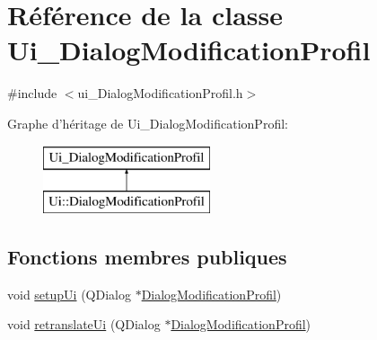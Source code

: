 \hypertarget{class_ui___dialog_modification_profil}{\section{Référence de la classe Ui\-\_\-\-Dialog\-Modification\-Profil}
\label{class_ui___dialog_modification_profil}
}


{\ttfamily \#include $<$ui\-\_\-\-Dialog\-Modification\-Profil.\-h$>$}

Graphe d'héritage de Ui\-\_\-\-Dialog\-Modification\-Profil\-:\begin{figure}[H]
\begin{center}
\leavevmode
\includegraphics[height=2.000000cm]{class_ui___dialog_modification_profil}
\end{center}
\end{figure}
\subsection*{Fonctions membres publiques}
\begin{DoxyCompactItemize}
\item 
void \hyperlink{class_ui___dialog_modification_profil_a48769dc430bb027d7b0b6df4bcd7146b}{setup\-Ui} (Q\-Dialog $\ast$\hyperlink{class_dialog_modification_profil}{Dialog\-Modification\-Profil})
\item 
void \hyperlink{class_ui___dialog_modification_profil_aaa740d7d565aabc709ec9b4e5ca46568}{retranslate\-Ui} (Q\-Dialog $\ast$\hyperlink{class_dialog_modification_profil}{Dialog\-Modification\-Profil})
\end{DoxyCompactItemize}

